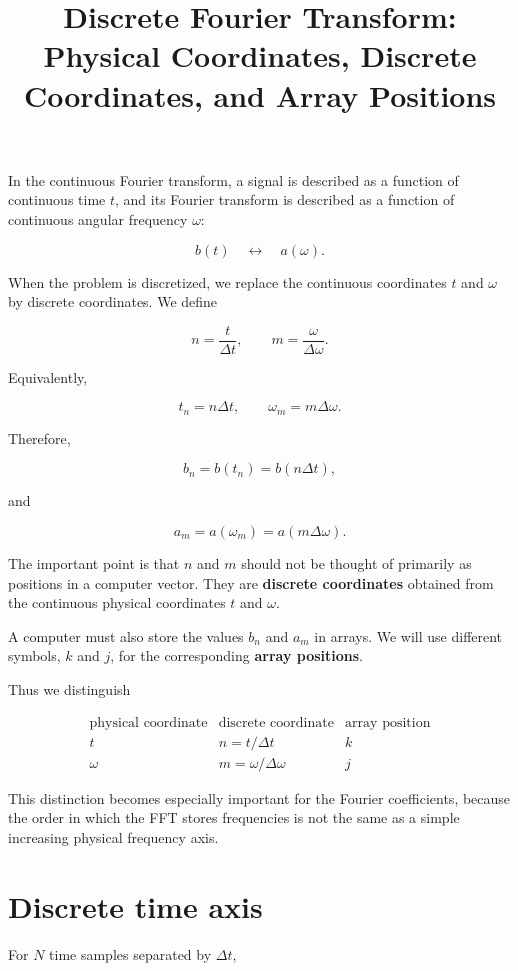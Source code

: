 \documentclass[11pt]{article}
\title{Discrete Fourier Transform:
Physical Coordinates, Discrete Coordinates, and Array Positions}
\author{}
\date{}
\begin{document}
\maketitle

In the continuous Fourier transform, a signal is described as a function of
continuous time $t$, and its Fourier transform is described as a function of
continuous angular frequency $\omega$:

\[
b(t) \quad \longleftrightarrow \quad a(\omega).
\]

When the problem is discretized, we replace the continuous coordinates
$t$ and $\omega$ by discrete coordinates. We define

\[
n=\frac{t}{\Delta t},
\qquad
m=\frac{\omega}{\Delta\omega}.
\]

Equivalently,

\[
t_n=n\Delta t,
\qquad
\omega_m=m\Delta\omega.
\]

Therefore,

\[
b_n=b(t_n)=b(n\Delta t),
\]

and

\[
a_m=a(\omega_m)=a(m\Delta\omega).
\]

The important point is that $n$ and $m$ should not be thought of primarily
as positions in a computer vector. They are \textbf{discrete coordinates}
obtained from the continuous physical coordinates $t$ and $\omega$.

A computer must also store the values $b_n$ and $a_m$ in arrays. We will use
different symbols, $k$ and $j$, for the corresponding \textbf{array positions}.

Thus we distinguish

\[
\boxed{
\begin{array}{ccc}
\text{physical coordinate} &
\text{discrete coordinate} &
\text{array position}
\\[2mm]
t & n=t/\Delta t & k
\\
\omega & m=\omega/\Delta\omega & j
\end{array}
}
\]

This distinction becomes especially important for the Fourier coefficients,
because the order in which the FFT stores frequencies is not the same as a
simple increasing physical frequency axis.

\section*{Discrete time axis}

For $N$ time samples separated by $\Delta t$,
\end{document}
